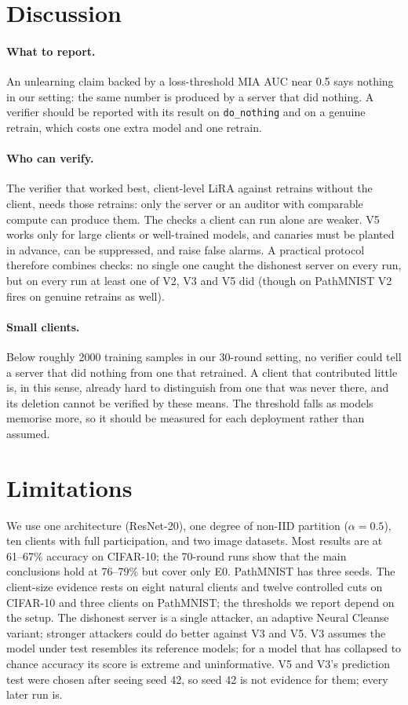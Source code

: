 \documentclass[11pt]{article}
\newcommand{\m}[1]{\texttt{#1}}
\newcommand{\dn}{\m{do\_nothing}}
\begin{document}
\section{Discussion}

\paragraph{What to report.} An unlearning claim backed by a loss-threshold MIA
AUC near 0.5 says nothing in our setting: the same number is produced by a
server that did nothing. A verifier should be reported with its result on
\dn{} and on a genuine retrain, which costs one extra model and one retrain.

\paragraph{Who can verify.} The verifier that worked best, client-level LiRA
against retrains without the client, needs those retrains: only the server or
an auditor with comparable compute can produce them. The checks a client can
run alone are weaker. V5 works only for large clients or well-trained models,
and canaries must be planted in advance, can be suppressed, and raise false
alarms. A practical protocol therefore combines checks: no single one caught
the dishonest server on every run, but on every run at least one of V2, V3 and
V5 did (though on PathMNIST V2 fires on genuine retrains as well).

\paragraph{Small clients.} Below roughly 2000 training samples in our 30-round
setting, no verifier could tell a server that did nothing from one that
retrained. A client that contributed little is, in this sense, already hard to
distinguish from one that was never there, and its deletion cannot be
verified by these means. The threshold falls as models memorise more, so it
should be measured for each deployment rather than assumed.

\section{Limitations}

We use one architecture (ResNet-20), one degree of non-IID partition
($\alpha=0.5$), ten clients with full participation, and two image datasets.
Most results are at 61--67\% accuracy on CIFAR-10; the 70-round runs show that
the main conclusions hold at 76--79\% but cover only E0. PathMNIST has three
seeds. The client-size evidence rests on eight natural clients and twelve
controlled cuts on CIFAR-10 and three clients on PathMNIST; the thresholds we
report depend on the setup. The dishonest server is a single attacker, an
adaptive Neural Cleanse variant; stronger attackers could do better against
V3 and V5. V3 assumes the model under test resembles its reference models; for
a model that has collapsed to chance accuracy its score is extreme and
uninformative. V5 and V3's prediction test were chosen after seeing seed 42,
so seed 42 is not evidence for them; every later run is.
\end{document}
